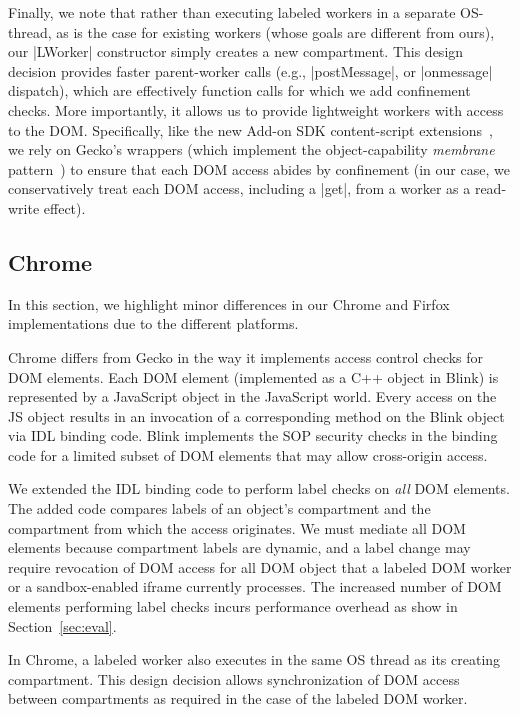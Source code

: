 %

Finally, we note that rather than executing labeled workers in a
separate OS-thread, as is the case for existing workers (whose goals
are different from ours), our \js|LWorker| constructor simply creates a new
compartment. This design decision provides 
%
faster parent-worker calls (e.g.,
\js|postMessage|, or \js|onmessage| dispatch), which are effectively function
calls for which we add confinement checks. 
%
More importantly, it allows us to provide lightweight workers with access to the
DOM.
%
Specifically, like the new Add-on SDK content-script
extensions~\cite{addon-sdk}, we rely on Gecko's wrappers (which implement the
object-capability \emph{membrane}
pattern~\cite{miller2003paradigm,miller2006robust}) to ensure that each DOM
access abides by confinement (in our case, we conservatively treat each DOM
access, including a \js|get|, from a worker as a read-write effect).
%

\subsection{Chrome}
\label{sec:implementation:firefox}

In this section, we highlight minor differences in
our Chrome and Firfox implementations due to
the different platforms.

Chrome differs from Gecko in the way it implements
access control checks for
DOM elements. Each DOM element (implemented as a
C++ object in Blink) is represented by a JavaScript
object in the JavaScript world. Every access on
the JS object results in an invocation of a
corresponding method on the Blink object via IDL
binding code. Blink implements the SOP security
checks in the binding code for a limited subset of
DOM elements that may allow cross-origin access.

We extended the IDL binding code to perform label
checks on {\em all} DOM elements.
The added code compares labels of an object's compartment
and the compartment from which the access originates.
We must mediate all DOM elements because
compartment labels
are dynamic, and a label change may require
revocation of DOM access for all DOM object that a
labeled DOM worker or a sandbox-enabled iframe
currently processes.
The increased number of DOM elements
performing label checks incurs
performance overhead as show in Section~\ref{sec:eval}.

In Chrome, a labeled worker also executes in the same
OS thread as its creating compartment. This design
decision allows
synchronization of DOM access between compartments
as required in
the case of the labeled DOM worker.



